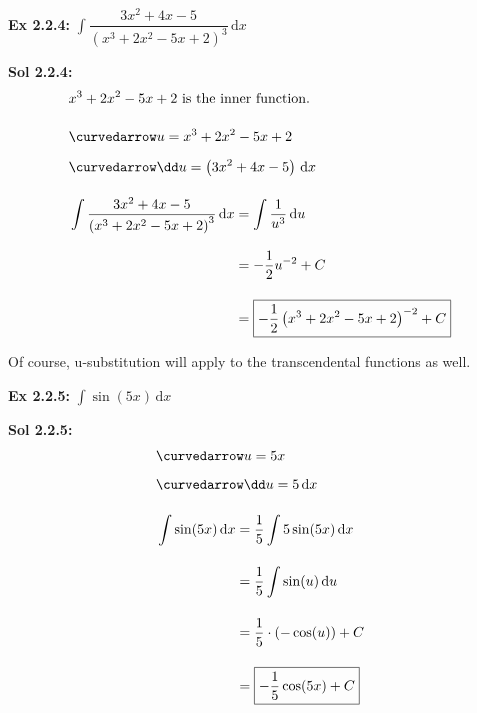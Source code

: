 \begin{tcolorbox}[example]
    \textbf{Ex 2.2.4: } $\int \dfrac{3x^2 + 4x - 5}{\left(x^3 + 2x^2 - 5x + 2\right)^3} \,\mathrm{d}x$
\end{tcolorbox}
\begin{tcolorbox}[solution]
    \textbf{Sol 2.2.4: } \begin{align*}
        & x^3 + 2x^2 - 5x + 2 \text{ is the inner function.} \\[11pt]
        & \curvedarrow u = x^3 + 2x^2 - 5x + 2 \\[5.5pt]
        & \curvedarrow \dd u = \left(3x^2 + 4x - 5\right) \,\mathrm{d}x \\[11pt]
        & \int \dfrac{3x^2 + 4x - 5}{\left(x^3 + 2x^2 - 5x + 2\right)^3} \,\mathrm{d}x \begin{aligned}[t]
            & = \int \dfrac{1}{u^3} \,\mathrm{d}u \\[11pt]
            & = -\dfrac{1}{2}u^{-2} + C \\[11pt]
            & = \boxed{-\dfrac{1}{2}\left(x^3 + 2x^2 - 5x + 2\right)^{-2} + C}
        \end{aligned} 
    \end{align*}
\end{tcolorbox}

Of course, u-substitution will apply to the transcendental functions as well. \par

\begin{tcolorbox}[example]
    \textbf{Ex 2.2.5: } $\int \sin (5x) \,\mathrm{d}x$
\end{tcolorbox}
\begin{tcolorbox}[solution]
    \textbf{Sol 2.2.5: } \begin{align*}
        & \curvedarrow u = 5x \\[5.5pt]
        & \curvedarrow \dd u = 5 \,\mathrm{d}x \\[11pt]
        & \int \sin (5x) \,\mathrm{d}x \begin{aligned}[t]
            & = \dfrac{1}{5}\int 5\sin (5x) \,\mathrm{d}x \\[11pt]
            & = \dfrac{1}{5}\int \sin (u) \,\mathrm{d}u \\[11pt]
            & = \dfrac{1}{5} \cdot (-\cos (u)) + C \\[11pt]
            & = \boxed{-\dfrac{1}{5}\cos (5x) + C}
        \end{aligned}
    \end{align*}
\end{tcolorbox} \vspace{11pt}

